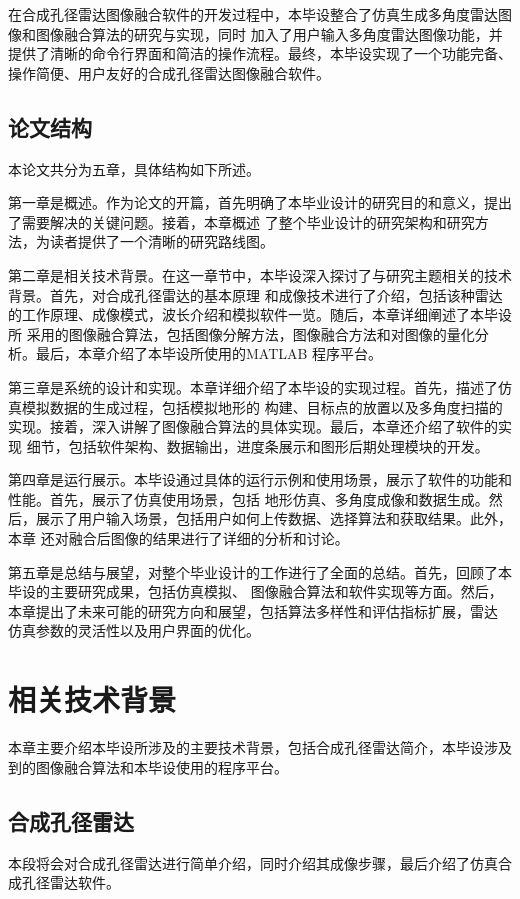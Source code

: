 \documentclass{xduugthesis}
\begin{document}
在合成孔径雷达图像融合软件的开发过程中，本毕设整合了仿真生成多角度雷达图像和图像融合算法的研究与实现，同时
加入了用户输入多角度雷达图像功能，并提供了清晰的命令行界面和简洁的操作流程。最终，本毕设实现了一个功能完备、
操作简便、用户友好的合成孔径雷达图像融合软件。
\section{论文结构}
本论文共分为五章，具体结构如下所述。\par
第一章是概述。作为论文的开篇，首先明确了本毕业设计的研究目的和意义，提出了需要解决的关键问题。接着，本章概述
了整个毕业设计的研究架构和研究方法，为读者提供了一个清晰的研究路线图。\par
第二章是相关技术背景。在这一章节中，本毕设深入探讨了与研究主题相关的技术背景。首先，对合成孔径雷达的基本原理
和成像技术进行了介绍，包括该种雷达的工作原理、成像模式，波长介绍和模拟软件一览。随后，本章详细阐述了本毕设所
采用的图像融合算法，包括图像分解方法，图像融合方法和对图像的量化分析。最后，本章介绍了本毕设所使用的MATLAB
程序平台。\par
第三章是系统的设计和实现。本章详细介绍了本毕设的实现过程。首先，描述了仿真模拟数据的生成过程，包括模拟地形的
构建、目标点的放置以及多角度扫描的实现。接着，深入讲解了图像融合算法的具体实现。最后，本章还介绍了软件的实现
细节，包括软件架构、数据输出，进度条展示和图形后期处理模块的开发。\par
第四章是运行展示。本毕设通过具体的运行示例和使用场景，展示了软件的功能和性能。首先，展示了仿真使用场景，包括
地形仿真、多角度成像和数据生成。然后，展示了用户输入场景，包括用户如何上传数据、选择算法和获取结果。此外，本章
还对融合后图像的结果进行了详细的分析和讨论。\par
第五章是总结与展望，对整个毕业设计的工作进行了全面的总结。首先，回顾了本毕设的主要研究成果，包括仿真模拟、
图像融合算法和软件实现等方面。然后，本章提出了未来可能的研究方向和展望，包括算法多样性和评估指标扩展，雷达
仿真参数的灵活性以及用户界面的优化。
\chapter{相关技术背景}
本章主要介绍本毕设所涉及的主要技术背景，包括合成孔径雷达简介，本毕设涉及到的图像融合算法和本毕设使用的程序平台。
\section{合成孔径雷达}
本段将会对合成孔径雷达进行简单介绍，同时介绍其成像步骤，最后介绍了仿真合成孔径雷达软件。
\end{document}
